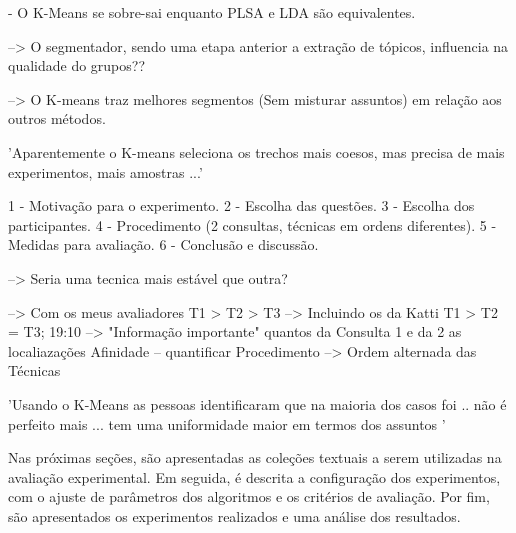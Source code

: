 
 - O K-Means se sobre-sai enquanto PLSA e LDA são equivalentes.

--> O segmentador, sendo uma etapa anterior a extração de tópicos, influencia na qualidade do grupos??

--> O K-means traz melhores segmentos (Sem misturar assuntos) em relação aos outros métodos.

'Aparentemente o K-means seleciona os trechos mais coesos, mas precisa de mais experimentos, mais amostras ...'


 1 - Motivação para o experimento.
 2 - Escolha das questões.
 3 - Escolha dos participantes.
 4 - Procedimento (2 consultas, técnicas em ordens diferentes).
 5 - Medidas para avaliação.
 6 - Conclusão e discussão.



--> Seria uma tecnica mais estável que outra? 


--> Com os meus avaliadores T1 > T2 > T3
--> Incluindo os da Katti   T1 > T2 = T3;
19:10 --> "Informação importante"
quantos da Consulta 1 e da 2
as localiazações
Afinidade -- quantificar
Procedimento --> Ordem alternada das Técnicas





'Usando o K-Means as pessoas identificaram que na maioria dos casos foi .. não é perfeito mais ... tem uma uniformidade maior em termos dos assuntos '





Nas próximas seções, são apresentadas as coleções textuais a serem utilizadas na avaliação experimental. Em seguida, é descrita a configuração dos experimentos, com o ajuste de parâmetros dos algoritmos e os critérios de avaliação. Por fim, são apresentados os experimentos realizados e uma análise dos resultados.


